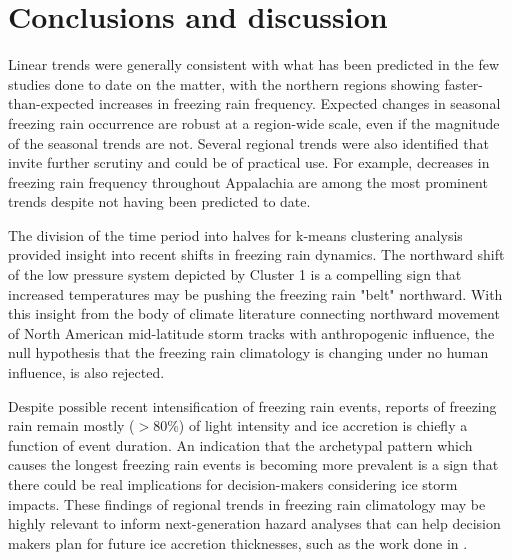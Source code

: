 \documentclass[twocol]{ametsoc}
\begin{document}
\section{Conclusions and discussion}
Linear trends were generally consistent with what has been predicted in the few studies done to date on the matter, with the northern regions showing faster-than-expected increases in freezing rain frequency. Expected changes in seasonal freezing rain occurrence are robust at a region-wide scale, even if the magnitude of the seasonal trends are not. Several regional trends were also identified that invite further scrutiny and could be of practical use. For example, decreases in freezing rain frequency throughout Appalachia are among the most prominent trends despite not having been predicted to date. 

The division of the time period into halves for k-means clustering analysis provided insight into recent shifts in freezing rain dynamics. The northward shift of the low pressure system depicted by Cluster 1 is a compelling sign that increased temperatures may be pushing the freezing rain "belt" northward. With this insight from the body of climate literature connecting northward movement of North American mid-latitude storm tracks with anthropogenic influence, the null hypothesis that the freezing rain climatology is changing under no human influence, is also rejected. 

Despite possible recent intensification of freezing rain events, reports of freezing rain remain mostly ($>$80\%) of light intensity and ice accretion is chiefly a function of event duration. An indication that the archetypal pattern which causes the longest freezing rain events is becoming more prevalent is a sign that there could be real implications for decision-makers considering ice storm impacts. These findings of regional trends in freezing rain climatology may be highly relevant to inform next-generation hazard analyses that can help decision makers plan for future ice accretion thicknesses, such as the work done in \citet{erfani2014aggregated}.
\end{document}
